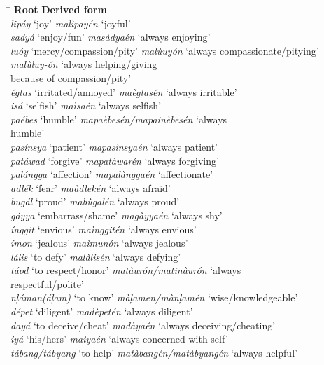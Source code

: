 \ea
\begin{tabbing}
\hspace{5cm} \= \kill
\textbf{Root}  \>  \textbf{Derived form} \\
\textit{lipáy} ‘joy’ \>   \textit{malìpayén} ‘joyful’ \\
\textit{sadyá} ‘enjoy/fun’ \> \textit{masàdyaén} ‘always enjoying’ \\
\textit{luóy} ‘mercy/compassion/pity’ \> \textit{malùuyón} ‘always compassionate/pitying’ \\
                                    \> \textit{malùluy-ón} ‘always helping/giving \\
                                    \> because of compassion/pity’ \\
\textit{égtas} ‘irritated/annoyed’ \> \textit{maègtasén} ‘always irritable’ \\
\textit{isá} ‘selfish’ \>   \textit{maìsaén} ‘always selfish’ \\
\textit{paébes} ‘humble’ \> \textit{mapaèbesén/mapainèbesén  } ‘always \\
                        \> humble’ \\
\textit{pasínsya} ‘patient’ \> \textit{mapasìnsyaén} ‘always patient’ \\
\textit{patáwad} ‘forgive’  \>  \textit{mapatàwarén} ‘always forgiving’ \\
\textit{palángga} ‘affection’ \> \textit{mapalànggaén} ‘affectionate’ \\
\textit{adlék} ‘fear’ \>   \textit{maàdlekén} ‘always afraid’ \\
\textit{bugál} ‘proud’  \>  \textit{mabùgalén} ‘always proud’ \\
\textit{gáyya} ‘embarrass/shame’ \> \textit{magàyyaén} ‘always shy’ \\
\textit{ínggit} ‘envious’ \>   \textit{maìnggitén} ‘always envious’ \\
\textit{ímon} ‘jealous’  \>  \textit{maìmunón} ‘always jealous’ \\
\textit{lális} ‘to defy’  \>  \textit{malàlisén} ‘always defying’ \\
\textit{táod} ‘to respect/honor’ \>  \textit{matàurón/matinàurón} ‘always \\
                                \> respectful/polite’ \\
\textit{nļáman(áļam)} ‘to know’ \> \textit{màļamen/mànļamén} ‘wise/knowledgeable’ \\
\textit{dépet} ‘diligent’ \> \textit{madèpetén} ‘always diligent’ \\
\textit{dayá} ‘to deceive/cheat’ \> \textit{madàyaén} ‘always deceiving/cheating’ \\
\textit{iyá} ‘his/hers’ \>   \textit{maìyaén} ‘always concerned with self’ \\
\textit{tábang/tábyang} ‘to help’ \> \textit{matàbangén/matàbyangén} ‘always helpful’
\end{tabbing}
\z

